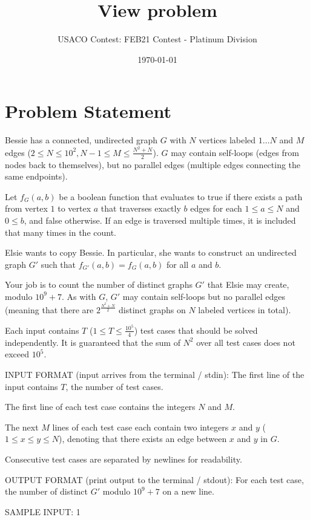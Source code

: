 \documentclass[12pt]{article}
\title{View problem}
\author{USACO Contest: FEB21 Contest - Platinum Division}
\date{\today}
\begin{document}
\maketitle

\section*{Problem Statement}

Bessie has a connected, undirected graph $G$ with $N$ vertices labeled
$1\ldots N$ and $M$ edges  ($2\le N\le 10^2, N-1\le M\le \frac{N^2+N}{2}$). $G$
may contain self-loops (edges from nodes back to themselves), but no parallel
edges (multiple edges connecting the same endpoints).

Let $f_G(a,b)$ be a boolean function that evaluates to true if there exists a
path from vertex $1$ to vertex $a$ that traverses exactly $b$ edges for each
$1\le a\le N$ and $0\le b$, and false otherwise. If an edge is traversed
multiple times, it is included that many times in the count.

Elsie wants to copy Bessie. In particular, she wants to construct an undirected
graph $G'$ such that $f_{G'}(a,b)=f_G(a,b)$ for all $a$ and $b$.

Your job is to count the number of distinct graphs $G'$ that Elsie may create,
modulo $10^9+7$. As with $G$, $G'$ may contain self-loops but no parallel edges
(meaning that there are $2^{\frac{N^2+N}{2}}$ distinct graphs on $N$ labeled
vertices in total).

Each input contains $T$ ($1\le T\le \frac{10^5}{4}$) test cases that should be
solved independently. It is guaranteed that the sum of $N^2$ over all test cases
does not exceed $10^5$.

INPUT FORMAT (input arrives from the terminal / stdin):
The first line of the input contains $T$, the number of test cases.

The first line of each test case contains the integers $N$ and $M$. 

The next $M$ lines of each test case each contain two integers $x$ and $y$
($1\le x\le y\le N$), denoting that there exists an edge between $x$ and $y$ in
$G$.

Consecutive test cases are separated by newlines for readability. 

OUTPUT FORMAT (print output to the terminal / stdout):
For each test case, the number of distinct $G'$ modulo $10^9+7$ on a new line.

SAMPLE INPUT:
1
\end{document}
